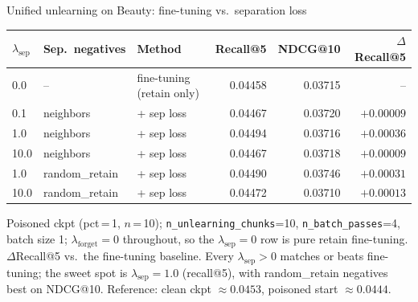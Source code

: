\begin{frame}{Unified unlearning on Beauty: fine-tuning vs.\ separation loss}
  \begin{table}
    \centering
    \footnotesize
    \begin{tabular}{l l l r r r}
      \hline
      $\lambda_{\text{sep}}$ & Sep.\ negatives & Method & Recall@5 & NDCG@10 & $\Delta$Recall@5 \\
      \hline
      0.0  & --             & fine-tuning (retain only) & 0.04458 & 0.03715 & --         \\[2pt]
      0.1  & neighbors      & + sep loss                & 0.04467 & 0.03720 & $+0.00009$ \\
      1.0  & neighbors      & + sep loss                & 0.04494 & 0.03716 & $+0.00036$ \\
      10.0 & neighbors      & + sep loss                & 0.04467 & 0.03718 & $+0.00009$ \\[2pt]
      1.0  & random\_retain & + sep loss                & 0.04490 & 0.03746 & $+0.00031$ \\
      10.0 & random\_retain & + sep loss                & 0.04472 & 0.03710 & $+0.00013$ \\
      \hline
    \end{tabular}
  \end{table}

  \medskip
  {\scriptsize
    Poisoned ckpt (pct\,=\,1, $n$\,=\,10); \texttt{n\_unlearning\_chunks}=10,
    \texttt{n\_batch\_passes}=4, batch size 1; $\lambda_{\text{forget}}=0$ throughout,
    so the $\lambda_{\text{sep}}=0$ row is pure retain fine-tuning.
    $\Delta$Recall@5 vs.\ the fine-tuning baseline.
    Every $\lambda_{\text{sep}}>0$ matches or beats fine-tuning; the sweet spot is
    $\lambda_{\text{sep}}=1.0$ (recall@5), with random\_retain negatives best on NDCG@10.
    Reference: clean ckpt $\approx 0.0453$, poisoned start $\approx 0.0444$.}
\end{frame}
